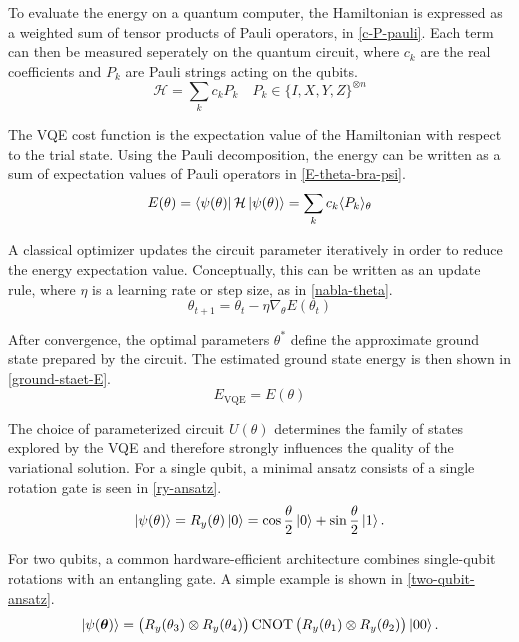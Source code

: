 To evaluate the energy on a quantum computer, the Hamiltonian is expressed as a weighted sum of tensor products of Pauli operators, in \cref{c-P-pauli}. Each term can then be measured seperately on the quantum circuit, where $c_k$ are the real coefficients and $P_k$ are Pauli strings acting on the qubits.
\begin{equation}\label{c-P-pauli}
    \mathcal{H}=\sum_k c_kP_k 
    \quad
    P_k\in\{I,X,Y,Z\}^{\otimes n}
\end{equation}

The VQE cost function is the expectation value of the Hamiltonian with respect to the trial state. Using the Pauli decomposition, the energy can be written as a sum of expectation values of Pauli operators in \cref{E-theta-bra-psi}.
\begin{equation}\label{E-theta-bra-psi}
    E(\theta)=\left\langle \psi(\theta) \right|\mathcal{H}\left| \psi(\theta) \right\rangle = \sum_k c_k \langle P_k \rangle_\theta
\end{equation}

A classical optimizer updates the circuit parameter iteratively in order to reduce the energy expectation value. Conceptually, this can be written as an update rule, where $\eta$ is a learning rate or step size, as in \cref{nabla-theta}.
\begin{equation}\label{nabla-theta}
    \theta_{t+1} = \theta_t - \eta\nabla_{\theta}E(\theta_t)
\end{equation}

After convergence, the optimal parameters $\theta^*$ define the approximate ground state prepared by the circuit. The estimated ground state energy is then shown in \cref{ground-staet-E}.
\begin{equation}\label{ground-staet-E}
    E_{\text{VQE}} = E(\theta)
\end{equation}

The choice of parameterized circuit $U(\theta)$ determines the family of states explored by the VQE and therefore strongly influences the quality of the variational solution. For a single qubit, a minimal ansatz consists of a single rotation gate is seen in \cref{ry-ansatz}.
\begin{equation}\label{ry-ansatz}
\left| \psi(\theta) \right\rangle = R_y(\theta)\left| 0 \right\rangle
= \cos\frac{\theta}{2}\left| 0 \right\rangle + \sin\frac{\theta}{2}\left| 1 \right\rangle.
\end{equation}

For two qubits, a common hardware-efficient architecture combines single-qubit rotations with an entangling gate. A simple example is shown in \cref{two-qubit-ansatz}.
\begin{equation}\label{two-qubit-ansatz}
\left| \psi(\boldsymbol{\theta}) \right\rangle =
\big(R_y(\theta_3)\otimes R_y(\theta_4)\big)
\,\mathrm{CNOT}\,
\big(R_y(\theta_1)\otimes R_y(\theta_2)\big)\left| 00 \right\rangle.
\end{equation}

